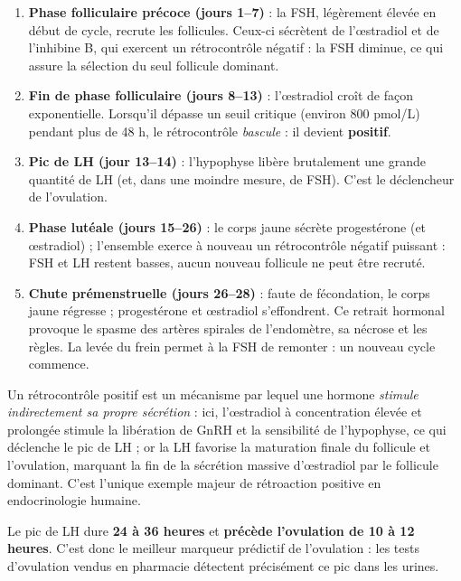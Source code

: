 \documentclass[11pt]{article}
\newcommand{\cle}[1]{{\popxbold\color{popdark}#1}}
\begin{document}
\begin{enumerate}
\item \textbf{Phase folliculaire précoce (jours 1--7)} : la FSH, légèrement élevée en début de cycle, recrute les follicules. Ceux-ci sécrètent de l'œstradiol et de l'inhibine B, qui exercent un \cle{rétrocontrôle négatif} : la FSH diminue, ce qui assure la sélection du seul follicule dominant.
\item \textbf{Fin de phase folliculaire (jours 8--13)} : l'œstradiol croît de façon exponentielle. Lorsqu'il dépasse un \cle{seuil critique} (environ 800 pmol/L) pendant plus de 48 h, le rétrocontrôle \emph{bascule} : il devient \textbf{positif}.
\item \textbf{Pic de LH (jour 13--14)} : l'hypophyse libère brutalement une grande quantité de LH (et, dans une moindre mesure, de FSH). C'est le déclencheur de l'ovulation.
\item \textbf{Phase lutéale (jours 15--26)} : le corps jaune sécrète progestérone (et œstradiol) ; l'ensemble exerce à nouveau un \cle{rétrocontrôle négatif} puissant : FSH et LH restent basses, aucun nouveau follicule ne peut être recruté.
\item \textbf{Chute prémenstruelle (jours 26--28)} : faute de fécondation, le corps jaune régresse ; progestérone et œstradiol s'effondrent. Ce retrait hormonal provoque le spasme des artères spirales de l'endomètre, sa nécrose et les règles. La levée du frein permet à la FSH de remonter : un nouveau cycle commence.
\end{enumerate}

\begin{definition}
Un \cle{rétrocontrôle positif} est un mécanisme par lequel une hormone \emph{stimule indirectement sa propre sécrétion} : ici, l'œstradiol à concentration élevée et prolongée stimule la libération de GnRH et la sensibilité de l'hypophyse, ce qui déclenche le pic de LH ; or la LH favorise la maturation finale du follicule et l'ovulation, marquant la fin de la sécrétion massive d'œstradiol par le follicule dominant. C'est l'unique exemple majeur de rétroaction positive en endocrinologie humaine.
\end{definition}

\begin{propriete}
Le pic de LH dure \textbf{24 à 36 heures} et \textbf{précède l'ovulation de 10 à 12 heures}. C'est donc le meilleur marqueur prédictif de l'ovulation : les tests d'ovulation vendus en pharmacie détectent précisément ce pic dans les urines.
\end{propriete}
\end{document}
